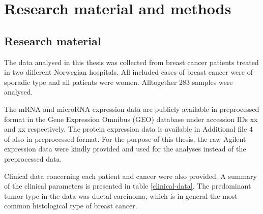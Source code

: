 


\section{Research material and methods}\label{material-and-methods}

\subsection{Research material}

The data analysed in this thesis was collected from breast cancer patients treated
in two different Norwegian hospitals. All included cases of breast cancer were
of sporadic type and all patients were women. Alltogether 283 samples were analysed.

The mRNA and microRNA expression data are publicly available in preprocessed
format in the Gene Expression Omnibus (GEO) database \citep{GEO} under
accession IDs xx and xx respectively. The protein expression data is available
in Additional file 4 of \citet{norjis} also in preprocessed format. For the purpose of this
thesis, the raw Agilent expression data were kindly provided and used for the analyses instead of the preprocessed data.

Clinical data concerning each patient and cancer were also provided. A summary
of the clinical parameters is presented in table \ref{clinical-data}. The
predominant tumor type in the data was ductal carcinoma, which is in general
the most common histological type of breast cancer.

